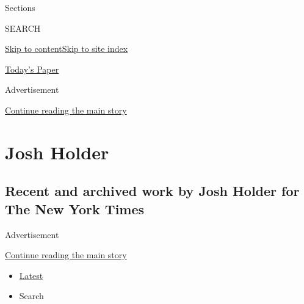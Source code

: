 Sections

SEARCH

\protect\hyperlink{site-content}{Skip to
content}\protect\hyperlink{site-index}{Skip to site index}

\href{https://myaccount.nytimes3xbfgragh.onion/auth/login?response_type=cookie\&client_id=vi}{}

\href{https://www.nytimes3xbfgragh.onion/section/todayspaper}{Today's
Paper}

Advertisement

\protect\hyperlink{after-top}{Continue reading the main story}

\hypertarget{josh-holder}{%
\section{Josh Holder}\label{josh-holder}}

\hypertarget{recent-and-archived-work-by-josh-holder-for-the-new-york-times}{%
\subsection{Recent and archived work by Josh Holder for The New York
Times}\label{recent-and-archived-work-by-josh-holder-for-the-new-york-times}}

Advertisement

\protect\hyperlink{after-mid1}{Continue reading the main story}

\begin{itemize}
\tightlist
\item
  \protect\hyperlink{stream-panel}{Latest}
\item
  Search
\end{itemize}

